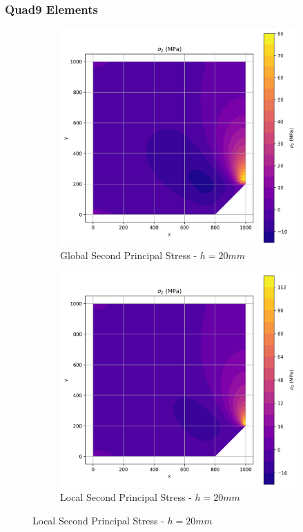 \subsubsection{Quad9 Elements}

\begin{figure}[H]
  \centering
  \begin{subfigure}[b]{0.45\textwidth}
    \centering
    \includegraphics[width=\textwidth]{GRAFICOS/Quad9/2mm_global/resultados - sigma_2.png}
    \caption{Global Second Principal Stress - $h=20mm$}
    \label{fig:img1}
  \end{subfigure}
  \hfill
  \begin{subfigure}[b]{0.45\textwidth}
    \centering
    \includegraphics[width=\textwidth]{GRAFICOS/Quad9/2mm_local/resultados - sigma_2.png}
    \caption{Local Second Principal Stress - $h=20mm$}
    \label{fig:img2}
  \end{subfigure}
\end{figure}

